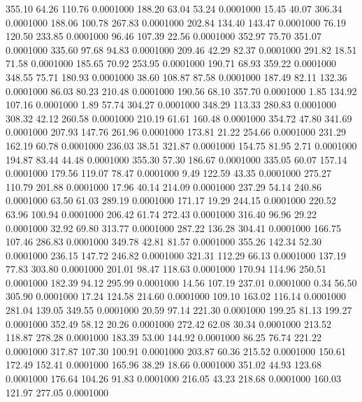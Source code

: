  355.10   64.26  110.76   0.0001000
 188.20   63.04   53.24   0.0001000
  15.45   40.07  306.34   0.0001000
 188.06  100.78  267.83   0.0001000
 202.84  134.40  143.47   0.0001000
  76.19  120.50  233.85   0.0001000
  96.46  107.39   22.56   0.0001000
 352.97   75.70  351.07   0.0001000
 335.60   97.68   94.83   0.0001000
 209.46   42.29   82.37   0.0001000
 291.82   18.51   71.58   0.0001000
 185.65   70.92  253.95   0.0001000
 190.71   68.93  359.22   0.0001000
 348.55   75.71  180.93   0.0001000
  38.60  108.87   87.58   0.0001000
 187.49   82.11  132.36   0.0001000
  86.03   80.23  210.48   0.0001000
 190.56   68.10  357.70   0.0001000
   1.85  134.92  107.16   0.0001000
   1.89   57.74  304.27   0.0001000
 348.29  113.33  280.83   0.0001000
 308.32   42.12  260.58   0.0001000
 210.19   61.61  160.48   0.0001000
 354.72   47.80  341.69   0.0001000
 207.93  147.76  261.96   0.0001000
 173.81   21.22  254.66   0.0001000
 231.29  162.19   60.78   0.0001000
 236.03   38.51  321.87   0.0001000
 154.75   81.95    2.71   0.0001000
 194.87   83.44   44.48   0.0001000
 355.30   57.30  186.67   0.0001000
 335.05   60.07  157.14   0.0001000
 179.56  119.07   78.47   0.0001000
   9.49  122.59   43.35   0.0001000
 275.27  110.79  201.88   0.0001000
  17.96   40.14  214.09   0.0001000
 237.29   54.14  240.86   0.0001000
  63.50   61.03  289.19   0.0001000
 171.17   19.29  244.15   0.0001000
 220.52   63.96  100.94   0.0001000
 206.42   61.74  272.43   0.0001000
 316.40   96.96   29.22   0.0001000
  32.92   69.80  313.77   0.0001000
 287.22  136.28  304.41   0.0001000
 166.75  107.46  286.83   0.0001000
 349.78   42.81   81.57   0.0001000
 355.26  142.34   52.30   0.0001000
 236.15  147.72  246.82   0.0001000
 321.31  112.29   66.13   0.0001000
 137.19   77.83  303.80   0.0001000
 201.01   98.47  118.63   0.0001000
 170.94  114.96  250.51   0.0001000
 182.39   94.12  295.99   0.0001000
  14.56  107.19  237.01   0.0001000
   0.34   56.50  305.90   0.0001000
  17.24  124.58  214.60   0.0001000
 109.10  163.02  116.14   0.0001000
 281.04  139.05  349.55   0.0001000
  20.59   97.14  221.30   0.0001000
 199.25   81.13  199.27   0.0001000
 352.49   58.12   20.26   0.0001000
 272.42   62.08   30.34   0.0001000
 213.52  118.87  278.28   0.0001000
 183.39   53.00  144.92   0.0001000
  86.25   76.74  221.22   0.0001000
 317.87  107.30  100.91   0.0001000
 203.87   60.36  215.52   0.0001000
 150.61  172.49  152.41   0.0001000
 165.96   38.29   18.66   0.0001000
 351.02   44.93  123.68   0.0001000
 176.64  104.26   91.83   0.0001000
 216.05   43.23  218.68   0.0001000
 160.03  121.97  277.05   0.0001000
